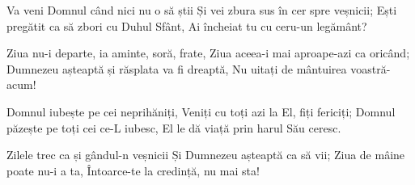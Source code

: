 \beginverse
Va veni Domnul când nici nu o să știi
Și vei zbura sus în cer spre veșnicii;
Ești pregătit ca să zbori cu Duhul Sfânt,
Ai încheiat tu cu ceru-un legământ?
\endverse

\beginchorus
Ziua nu-i departe, ia aminte, soră, frate,
Ziua aceea-i mai aproape-azi ca oricând;
Dumnezeu așteaptă și răsplata va fi dreaptă,
Nu uitați de mântuirea voastră-acum!
\endchorus

\beginverse
Domnul iubește pe cei neprihăniți,
Veniți cu toți azi la El, fiți fericiți;
Domnul păzește pe toți cei ce-L iubesc,
El le dă viață prin harul Său ceresc.
\endverse

\beginverse
Zilele trec ca și gândul-n veșnicii
Și Dumnezeu așteaptă ca să vii;
Ziua de mâine poate nu-i a ta,
Întoarce-te la credință, nu mai sta!
\endverse
\endsong